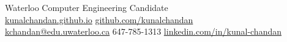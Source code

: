 \documentclass[]{chandan-cv}
\begin{document}
%
%

%
%
{
	Waterloo Computer Engineering Candidate \\
	\href{http://kunalchandan.github.io}{kunalchandan.github.io}
	\hfill
	\href{http://github.com/kunalchandan}{github.com/kunalchandan}\\
	\href{mailto:kchandan@edu.uwaterloo.ca}{kchandan@edu.uwaterloo.ca}
	\hfill
	647-785-1313
	\hfill
	\href{https://www.linkedin.com/in/kunal-chandan/}{linkedin.com/in/kunal-chandan}
}

%
%
\end{document}
